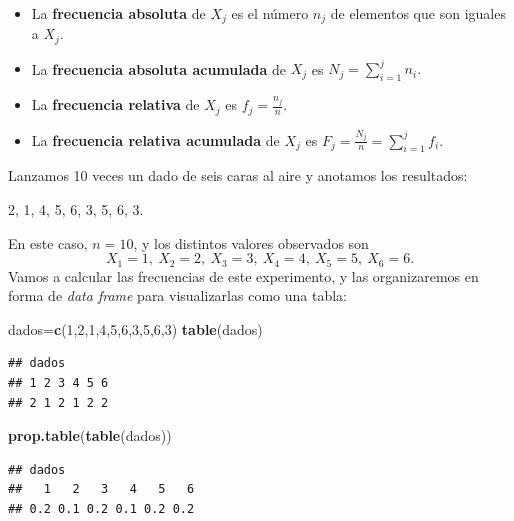 \documentclass[]{book}
\newenvironment{Shaded}{\begin{snugshade}}{\end{snugshade}}
\newcommand{\DecValTok}[1]{\textcolor[rgb]{0.00,0.00,0.81}{#1}}
\newcommand{\KeywordTok}[1]{\textcolor[rgb]{0.13,0.29,0.53}{\textbf{#1}}}
\newcommand{\NormalTok}[1]{#1}
\theoremstyle{definition}
\theoremstyle{definition}
\theoremstyle{definition}
\theoremstyle{remark}
\let\BeginKnitrBlock\begin \let\EndKnitrBlock\end
\begin{document}
\begin{itemize}
\item
  La \textbf{frecuencia absoluta} de \(X_j\) es el número \(n_j\) de elementos que son iguales a \(X_j\).
\item
  La \textbf{frecuencia absoluta acumulada} de \(X_j\) es \(\displaystyle N_j=\sum\limits_{i=1}^j n_i.\)
\item
  La \textbf{frecuencia relativa} de \(X_j\) es \(\displaystyle f_j=\frac{n_j}{n}.\)
\item
  La \textbf{frecuencia relativa acumulada} de \(X_j\) es
  \(\displaystyle F_j=\frac{N_j}{n}=\sum\limits_{i=1}^j f_i.\)
\end{itemize}

\BeginKnitrBlock{example}
\protect\hypertarget{exm:dados}{}{\label{exm:dados} }Lanzamos 10 veces un dado de seis caras al aire y anotamos los resultados:
\EndKnitrBlock{example}

2, 1, 4, 5, 6, 3, 5, 6, 3.

En este caso, \(n=10\), y los distintos valores observados son
\[
X_1=1,\ X_2=2,\ X_3=3,\ X_4=4,\ X_5=5,\ X_6=6.
\]
Vamos a calcular las frecuencias de este experimento, y las organizaremos en forma de \emph{data frame} para visualizarlas como una tabla:

\begin{Shaded}
\begin{Highlighting}[]
\NormalTok{dados=}\KeywordTok{c}\NormalTok{(}\DecValTok{1}\NormalTok{,}\DecValTok{2}\NormalTok{,}\DecValTok{1}\NormalTok{,}\DecValTok{4}\NormalTok{,}\DecValTok{5}\NormalTok{,}\DecValTok{6}\NormalTok{,}\DecValTok{3}\NormalTok{,}\DecValTok{5}\NormalTok{,}\DecValTok{6}\NormalTok{,}\DecValTok{3}\NormalTok{)}
\KeywordTok{table}\NormalTok{(dados)}
\end{Highlighting}
\end{Shaded}

\begin{verbatim}
## dados
## 1 2 3 4 5 6 
## 2 1 2 1 2 2
\end{verbatim}

\begin{Shaded}
\begin{Highlighting}[]
\KeywordTok{prop.table}\NormalTok{(}\KeywordTok{table}\NormalTok{(dados))}
\end{Highlighting}
\end{Shaded}

\begin{verbatim}
## dados
##   1   2   3   4   5   6 
## 0.2 0.1 0.2 0.1 0.2 0.2
\end{verbatim}
\end{document}
